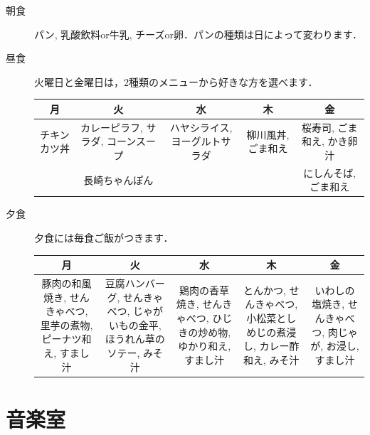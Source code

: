 \documentclass[10pt,b5jsbook,dvips,dvipdfmx,openany]{jsbook}
\theoremstyle{definition}
\begin{document}
		\begin{description}
			\item[朝食] パン, 乳酸飲料or牛乳, チーズor卵．パンの種類は日によって変わります．
			\item[昼食] 火曜日と金曜日は，2種類のメニューから好きな方を選べます．
				\begin{table}[]
				\begin{tabular}{|c|c|c|c|c|}
				\hline
				月      & 火                   & 水                & 木          & 金               \\ \hline
				チキンカツ丼 & カレーピラフ, サラダ, コーンスープ & ハヤシライス, ヨーグルトサラダ & 柳川風丼, ごま和え & 桜寿司, ごま和え, かき卵汁 \\ \hline
							& 長崎ちゃんぽん             &                  &            & にしんそば, ごま和え     \\ \hline
				\end{tabular}
				\end{table}
			\item[夕食] 夕食には毎食ご飯がつきます．
				\begin{table}[]
				\begin{tabular}{|c|c|c|c|c|}
				\hline
				月                                    & 火                                         & 水                                     & 木                                      & 金                                \\ \hline
				豚肉の和風焼き, せんきゃべつ, 里芋の煮物, ピーナツ和え, すまし汁 & 豆腐ハンバーグ, せんきゃべつ, じゃがいもの金平, ほうれん草のソテー, みそ汁 & 鶏肉の香草焼き, せんきゃべつ, ひじきの炒め物, ゆかり和え, すまし汁 & とんかつ, せんきゃべつ, 小松菜としめじの煮浸し, カレー酢和え, みそ汁 & いわしの塩焼き, せんきゃべつ, 肉じゃが, お浸し, すまし汁 \\ \hline
				\end{tabular}
				\end{table}
		\end{description}

\newpage

	\section{音楽室} \label{sec:MUC}
\end{document}
